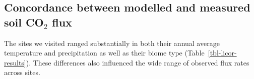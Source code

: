 \documentclass[
  letterpaper,
  DIV=11,
  numbers=noendperiod]{scrartcl}
\begin{document}
\subsection{\texorpdfstring{Concordance between modelled and measured
soil CO\(_{2}\)
flux}{Concordance between modelled and measured soil CO\_\{2\} flux}}\label{concordance-between-modelled-and-measured-soil-co_2-flux}

The sites we visited ranged substantially in both their annual average
temperature and precipitation as well as their biome type
(Table~\ref{tbl-licor-results}). These differences also influenced the
wide range of observed flux rates across sites.

\begin{table}

\caption{\label{tbl-licor-results}Summary of measured soil
characteristics and flux results from field measurements across six NEON
sites using a LI-COR 6800 (LI-870/8250 measurements omitted to enable
direct comparability) via the closed-dynamic chamber method. Numeric
values for soil CO\(_{2}\) flux, soil temperature, and volumetric soil
water content (VSWC) are the mean and standard deviation of field
measurements at each site.}


\end{table}%
\end{document}
